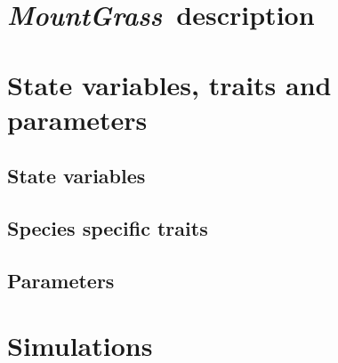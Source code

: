 \documentclass[review]{elsarticle}
\newcommand{\model}{\textbf{\textit{MountGrass}}~}
\begin{document}

\section{\model description}

\section{State variables, traits and parameters}
\subsection{State variables}
\subsection{Species specific traits}
\subsection{Parameters}

\section{Simulations}
\end{document}

